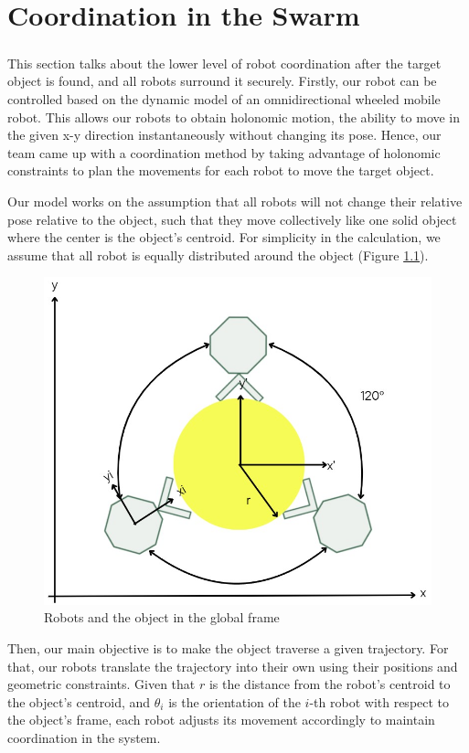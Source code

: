 \chapter{Coordination in the Swarm}

\paragraph*{}
This section talks about the lower level of robot coordination after the target object is found, and all robots surround it securely. Firstly, our robot can be controlled based on the dynamic model of an omnidirectional wheeled mobile robot. This allows our robots to obtain holonomic motion, the ability to move in the given x-y direction instantaneously without changing its pose. Hence, our team came up with a coordination method by taking advantage of holonomic constraints to plan the movements for each robot to move the target object.

Our model works on the assumption that all robots will not change their relative pose relative to the object, such that they move collectively like one solid object where the center is the object's centroid. For simplicity in the calculation, we assume that all robot is equally distributed around the object (Figure \ref{fig:coordination-diagram}).

\begin{figure} [H]
    \centering
    \includegraphics[width=0.5\linewidth]{assets/images/coordination/robots_with_object.jpg}
    \caption{Robots and the object in the global frame}
    \label{fig:coordination-diagram}
\end{figure}

Then, our main objective is to make the object traverse a given trajectory. For that, our robots translate the trajectory into their own using their positions and geometric constraints. Given that \( r \) is the distance from the robot's centroid to the object's centroid, and \( \theta_i \) is the orientation of the \( i \)-th robot with respect to the object's frame, each robot adjusts its movement accordingly to maintain coordination in the system.

